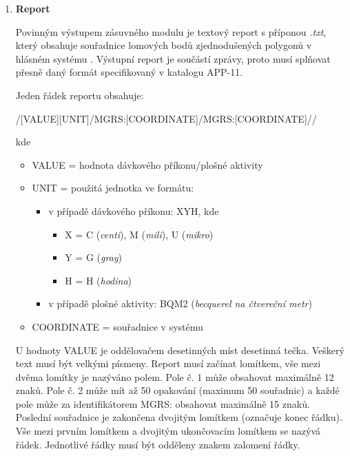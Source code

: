 \begin{enumerate}
	\item \textbf{Report}

          Povinným výstupem zásuvného modulu je textový report s
          příponou \textit{.txt}, který obsahuje souřadnice lomových
          bodů zjednodušených polygonů v hlásném systému
          . Výstupní report je součástí  zprávy,
          proto musí splňovat přesně daný formát specifikovaný v
          katalogu APP-11.

\newpage
Jeden řádek reportu obsahuje:

/[VALUE][UNIT]/MGRS:[COORDINATE]/MGRS:[COORDINATE]//

kde
\begin{itemize}
			\item VALUE = hodnota dávkového příkonu/plošné aktivity 
			
			\item UNIT = použitá jednotka ve formátu:
			
			\begin{itemize}
				\item v případě dávkového příkonu: XYH, kde
			 		\begin{itemize}
						\item X = C (\textit{centi}), M (\textit{mili}), U (\textit{mikro})
						\item Y = G (\textit{gray})
						\item H = H (\textit{hodina})
					\end{itemize}
				\item v případě plošné aktivity: BQM2 (\textit{becquerel na čtvereční metr})
			\end{itemize}
			
			\item COORDINATE = souřadnice v systému 
\end{itemize}
				
U hodnoty VALUE je oddělovačem desetinných míst desetinná
tečka. Veškerý text musí být velkými písmeny. Report musí začínat
lomítkem, vše mezi dvěma lomítky je nazýváno polem. Pole č. 1 může
obsahovat maximálně 12 znaků. Pole č. 2 může mít až 50 opakování
(maximum 50 souřadnic) a každé pole může za identifikátorem MGRS:
obsahovat maximálně 15 znaků. Poslední souřadnice je zakončena
dvojitým lomítkem (označuje konec řádku). Vše mezi prvním lomítkem a
dvojitým ukončovacím lomítkem se nazývá řádek. Jednotlivé řádky musí
být odděleny znakem zalomení řádky.


\end{enumerate}
